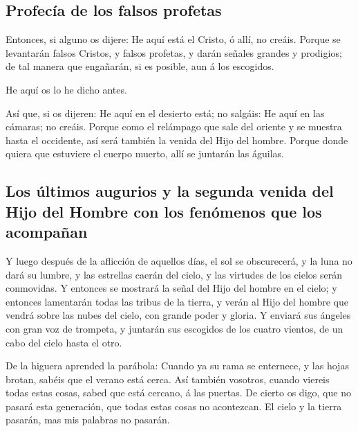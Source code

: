 \hypertarget{profecuxeda-de-los-falsos-profetas}{%
\subsection{Profecía de los falsos
profetas}\label{profecuxeda-de-los-falsos-profetas}}

 Entonces, si alguno os dijere: He aquí está el Cristo, ó
allí, no creáis.  Porque se levantarán falsos Cristos, y
falsos profetas, y darán señales grandes y prodigios; de tal manera que
engañarán, si es posible, aun á los escogidos.

 He aquí os lo he dicho antes.

 Así que, si os dijeren: He aquí en el desierto está; no
salgáis: He aquí en las cámaras; no creáis.  Porque como el
relámpago que sale del oriente y se muestra hasta el occidente, así será
también la venida del Hijo del hombre.  Porque donde quiera
que estuviere el cuerpo muerto, allí se juntarán las águilas.

\hypertarget{los-uxfaltimos-augurios-y-la-segunda-venida-del-hijo-del-hombre-con-los-fenuxf3menos-que-los-acompauxf1an}{%
\subsection{Los últimos augurios y la segunda venida del Hijo del Hombre
con los fenómenos que los
acompañan}\label{los-uxfaltimos-augurios-y-la-segunda-venida-del-hijo-del-hombre-con-los-fenuxf3menos-que-los-acompauxf1an}}

 Y luego después de la aflicción de aquellos días, el sol
se obscurecerá, y la luna no dará su lumbre, y las estrellas caerán del
cielo, y las virtudes de los cielos serán conmovidas.  Y
entonces se mostrará la señal del Hijo del hombre en el cielo; y
entonces lamentarán todas las tribus de la tierra, y verán al Hijo del
hombre que vendrá sobre las nubes del cielo, con grande poder y gloria.
 Y enviará sus ángeles con gran voz de trompeta, y juntarán
sus escogidos de los cuatro vientos, de un cabo del cielo hasta el otro.

 De la higuera aprended la parábola: Cuando ya su rama se
enternece, y las hojas brotan, sabéis que el verano está cerca.
 Así también vosotros, cuando viereis todas estas cosas,
sabed que está cercano, á las puertas.  De cierto os digo,
que no pasará esta generación, que todas estas cosas no acontezcan.
 El cielo y la tierra pasarán, mas mis palabras no pasarán.

